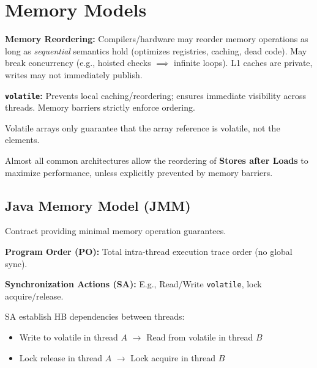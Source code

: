 \section{Memory Models}

\begin{definition}
    \textbf{Memory Reordering:} Compilers/hardware may reorder memory operations as long as \textit{sequential} semantics hold (optimizes registries, caching, dead code). May break concurrency (e.g., hoisted checks $\implies$ infinite loops). L1 caches are private, writes may not immediately publish.
\end{definition}

\begin{remark}
    \textbf{\texttt{volatile}:} Prevents local caching/reordering; ensures immediate visibility across threads. Memory barriers strictly enforce ordering.
\end{remark}

\begin{important}
    Volatile arrays only guarantee that the array reference is volatile, not the elements.
\end{important}

\begin{remark}
    Almost all common architectures allow the reordering of \textbf{Stores after Loads} to maximize performance, unless explicitly prevented by memory barriers.
\end{remark}

\subsection{Java Memory Model (JMM)}
Contract providing minimal memory operation guarantees.

\begin{definition} 
    \textbf{Program Order (PO):} Total intra-thread execution trace order (no global sync).
\end{definition}

\begin{definition}
    \textbf{Synchronization Actions (SA):} E.g., Read/Write \texttt{volatile}, lock acquire/release.
\end{definition}

\begin{remark}
    SA establish HB dependencies between threads:
    \begin{itemize}
        \item Write to volatile in thread $A$ $\rightarrow$ Read from volatile in thread $B$
        \item Lock release in thread $A$ $\rightarrow$ Lock acquire in thread $B$
    \end{itemize}
\end{remark}

